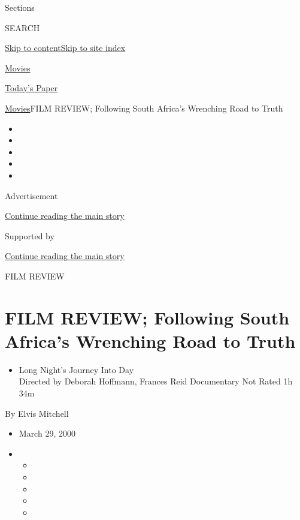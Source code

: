 Sections

SEARCH

\protect\hyperlink{site-content}{Skip to
content}\protect\hyperlink{site-index}{Skip to site index}

\href{https://www.nytimes3xbfgragh.onion/section/movies}{Movies}

\href{https://myaccount.nytimes3xbfgragh.onion/auth/login?response_type=cookie\&client_id=vi}{}

\href{https://www.nytimes3xbfgragh.onion/section/todayspaper}{Today's
Paper}

\href{/section/movies}{Movies}\textbar{}FILM REVIEW; Following South
Africa's Wrenching Road to Truth

\begin{itemize}
\item
\item
\item
\item
\item
\end{itemize}

Advertisement

\protect\hyperlink{after-top}{Continue reading the main story}

Supported by

\protect\hyperlink{after-sponsor}{Continue reading the main story}

FILM REVIEW

\hypertarget{film-review-following-south-africas-wrenching-road-to-truth}{%
\section{FILM REVIEW; Following South Africa's Wrenching Road to
Truth}\label{film-review-following-south-africas-wrenching-road-to-truth}}

\begin{itemize}
\tightlist
\item
  Long Night's Journey Into Day\\
  Directed by Deborah Hoffmann, Frances Reid Documentary Not Rated 1h
  34m
\end{itemize}

By Elvis Mitchell

\begin{itemize}
\item
  March 29, 2000
\item
  \begin{itemize}
  \item
  \item
  \item
  \item
  \item
  \end{itemize}
\end{itemize}

